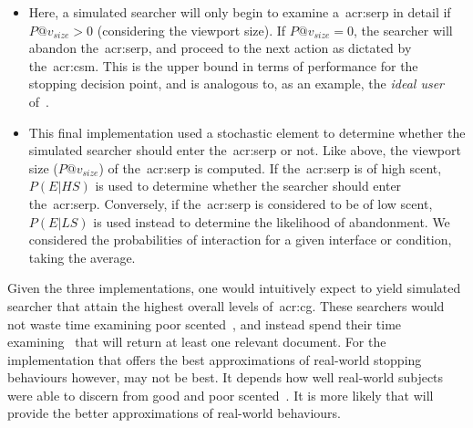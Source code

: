 \begin{itemize}
    \item{ Here, a simulated searcher will only begin to examine a~\gls{acr:serp} in detail if $P@v_{size} > 0$ (considering the viewport size). If $P@v_{size} = 0$, the searcher will abandon the~\gls{acr:serp}, and proceed to the next action as dictated by the~\gls{acr:csm}. This is the upper bound in terms of performance for the stopping decision point, and is analogous to, as an example, the \emph{ideal user} of~\cite{hagen2016simulating_users}.}
    
    \item{ This final implementation used a stochastic element to determine whether the simulated searcher should enter the~\gls{acr:serp} or not. Like above, the viewport size ($P@v_{size}$) of the~\gls{acr:serp} is computed. If the~\gls{acr:serp} is of high scent, $P(E|HS)$ is used to determine whether the searcher should enter the~\gls{acr:serp}. Conversely, if the~\gls{acr:serp} is considered to be of low scent, $P(E|LS)$ is used instead to determine the likelihood of abandonment. We considered the probabilities of interaction for a given interface or condition, taking the average.}
    
%
\end{itemize}

Given the three implementations, one would intuitively expect  to yield simulated searcher that attain the highest overall levels of~\gls{acr:cg}. These searchers would not waste time examining poor scented~, and instead spend their time examining~ that will return at least one relevant document. For the implementation that offers the best approximations of real-world stopping behaviours however,  may not be best. It depends how well real-world subjects were able to discern from good and poor scented~. It is more likely that  will provide the better approximations of real-world behaviours.

